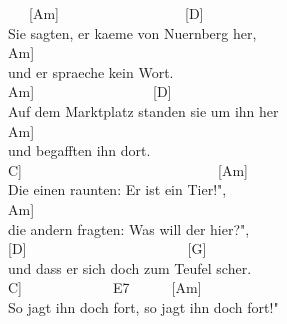\documentclass[
  letterpaper,
  a5paper]{memoir}
\begin{document}
~~~{[}Am{]}~~~~~~~~~~~~~~~~~~{[}D{]}\\
Sie sagten, er kaeme von Nuernberg her,\\
\hspace*{0.333em}\hspace*{0.333em}\hspace*{0.333em}\hspace*{0.333em}\hspace*{0.333em}\hspace*{0.333em}\hspace*{0.333em}{[}Am{]}\\
und er spraeche kein Wort.\\
\hspace*{0.333em}\hspace*{0.333em}\hspace*{0.333em}\hspace*{0.333em}\hspace*{0.333em}\hspace*{0.333em}\hspace*{0.333em}\hspace*{0.333em}{[}Am{]}~~~~~~~~~~~~~~~~~{[}D{]}~~~\\
Auf dem Marktplatz standen sie um ihn her\\
\hspace*{0.333em}\hspace*{0.333em}\hspace*{0.333em}\hspace*{0.333em}\hspace*{0.333em}\hspace*{0.333em}{[}Am{]}\\
und begafften ihn dort.\\
\hspace*{0.333em}\hspace*{0.333em}\hspace*{0.333em}{[}C{]}~~~~~~~~~~~~~~~~~~~~~~~~~~~~{[}Am{]}\\
Die einen raunten: Er ist ein Tier!",~~\\
\hspace*{0.333em}\hspace*{0.333em}\hspace*{0.333em}\hspace*{0.333em}\hspace*{0.333em}\hspace*{0.333em}\hspace*{0.333em}\hspace*{0.333em}\hspace*{0.333em}\hspace*{0.333em}{[}Am{]}\\
die andern fragten: Was will der hier?",\\
{[}D{]}~~~~~~~~~~~~~~~~~~~~~~~{[}G{]}\\
und dass er sich doch zum Teufel scher\textquotesingle.\\
\hspace*{0.333em}\hspace*{0.333em}\hspace*{0.333em}\hspace*{0.333em}{[}C{]}~~~~~~~~~~~~~E7~~~~~~{[}Am{]}\\
So jagt ihn doch fort, so jagt ihn doch fort!"
\end{document}
